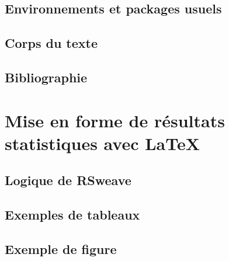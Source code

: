 \documentclass[8pt]{beamer}\usepackage[]{graphicx}\usepackage[]{xcolor}
\begin{document}
\subsection{Environnements et packages usuels}
\subsection{Corps du texte}
\subsection{Bibliographie}

\section{Mise en forme de résultats statistiques avec \LaTeX}
\subsection{Logique de RSweave}
\subsection{Exemples de tableaux}
\subsection{Exemple de figure}
	
	\begin{frame}
	\end{frame}
\end{document}

